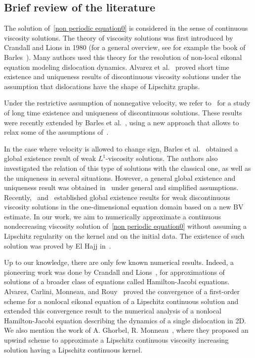 \documentclass[11pt]{amsart}
\begin{document}
\subsection{Brief review of the literature}
The solution of~\eqref{non periodic equation0} is considered in the sense of continuous viscosity solutions. The theory of viscosity solutions was first introduced by Crandall and Lions in 1980 (for a general overview, see for example the book of Barles~\cite{5}). Many authors used this theory for the resolution of non-local eikonal equation modeling dislocation dynamics. Alvarez et al.~\cite{311} proved short time existence and uniqueness results of discontinuous viscosity solutions under the assumption that dislocations have the shape of Lipschitz graphs. 

Under the restrictive assumption of nonnegative velocity, we refer to~\cite{211, 1720} for a study of long time existence and uniqueness of discontinuous solutions. These  results were recently extended by Barles et al.~\cite{8}, using a new approach that allows to relax some of the assumptions of~\cite{211, 1720}. 

In the case where velocity is allowed to change sign, Barles et al.~\cite{7} obtained a global existence result of weak $L^1$-viscosity solutions. The authors also investigated the relation of this type of solutions with the classical one, as well as the uniqueness in several situations. However, a general global existence and uniqueness result was obtained in~\cite{8} under general and simplified assumptions. Recently,~\cite{10} and~\cite{11} established global existence results for weak discontinuous viscosity solutions in the one-dimensional equation domain based on a new BV estimate. In our work, we aim to numerically approximate a continuous nondecreasing viscosity solution of~\eqref{non periodic equation0} without assuming a Lipschitz regularity on the kernel and on the initial data. The existence of such solution was proved by El Hajj in~\cite{1}. 

Up to our knowledge, there are only few known numerical results. Indeed, a pioneering work was done by Crandall and Lions~\cite{1350}, for approximations of solutions of a broader class of equations called Hamilton-Jacobi equations. Alvarez, Carlini, Monneau, and Rouy~\cite{250} proved the convergence of a first-order scheme for a nonlocal eikonal equation of a Lipschitz continuous solution and extended this convergence result to the numerical analysis of a nonlocal Hamilton-Jacobi equation describing the dynamics of a single dislocation in 2D. We also mention the work of A. Ghorbel, R. Monneau~\cite{50000}, where they proposed an upwind scheme to approximate a Lipschitz continuous viscosity increasing solution having a Lipschitz continuous kernel.
\end{document}
